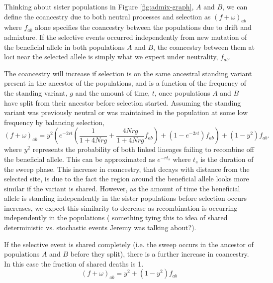 \documentclass[a4paper,10pt]{article}
\newcommand{\kl}[1]{{\color{orange} #1}}
\begin{document}
Thinking about sister populations in Figure \ref{fig:admix-graph}, $A$ and $B$, we can define the coancestry due to both neutral processes and selection as $(f + \omega)_{ab}$ where $f_{ab}$ alone specifies the coancestry between the populations due to drift and admixture.
If the selective events occurred independently from new mutation of the beneficial allele in both populations $A$ and $B$, the coancestry between them at loci near the selected allele is simply what we expect under neutrality, $f_{ab}$.

The coancestry will increase if selection is on the same ancestral standing variant present in the ancestor of the populations, and is a function of the frequency of the standing variant, $g$ and the amount of time, $t$, once populations $A$ and $B$ have split from their ancestor before selection started. Assuming the standing variant was previously neutral or was maintained in the population at some low frequency by balancing selection,
\begin{equation} 
(f+\omega)_{ab} = y^2 \left(e^{-2rt} \left(\frac{1}{1+4Nrg}+ \frac{4Nrg}{1+4Nrg}f_{ab} \right) + (1-e^{-2rt})f_{ab} \right) + (1-y^2)f_{ab}. 
\end{equation}
where $y^2$ represents the probability of both linked lineages failing to recombine off the beneficial allele. This can be approximated as $e^{-rt_s}$ where $t_s$ is the duration of the sweep phase. This increase in coancestry, that decays with distance from the selected site, is due to the fact the region around the beneficial allele looks more similar if the variant is shared. However, as the amount of time the beneficial allele is standing independently in the sister populations before selection occurs increases, we expect this similarity to decrease as recombination is occurring independently in the populations (\kl{something tying this to idea of shared deterministic vs. stochastic events Jeremy was talking about?}).

If the selective event is shared completely (i.e. the sweep occurs in the ancestor of populations $A$ and $B$ before they split), there is a further increase in coancestry. In this case the fraction of shared deaths is 1.
\begin{equation} \label{eq: sharedS}
(f+\omega)_{ab} = y^2 + (1-y^2) f_{ab}
\end{equation}
\end{document}
